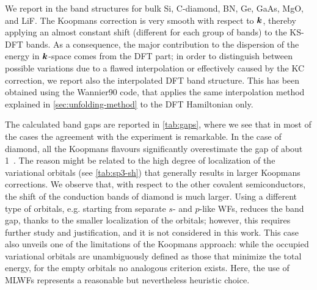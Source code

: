 We report in  the band structures for bulk Si, C-diamond, BN, Ge, GaAs, MgO, and LiF. The Koopmans correction is very smooth with respect to ${\bm k}$, thereby applying an almost constant shift (different for each group of bands) to the KS-DFT bands. As a consequence, the major contribution to the dispersion of the energy in ${\bm k}$-space comes from the DFT part; in order to distinguish between possible variations due to a flawed interpolation or effectively caused by the KC correction, we report also the interpolated DFT band structure. This has been obtained using the Wannier90 code, that applies the same interpolation method explained in \cref{sec:unfolding-method} to the DFT Hamiltonian only.

The calculated band gaps are reported in \cref{tab:gaps}, where we see that in most of the cases the agreement with the experiment is remarkable. In the case of diamond, all the Koopmans flavours significantly overestimate the gap of about 1~\ev. The reason might be related to the high degree of localization of the variational orbitals (see \cref{tab:sp3-sh}) that generally results in larger Koopmans corrections. We observe that, with respect to the other covalent semiconductors, the shift of the conduction bands of diamond is much larger. Using a different type of orbitals, e.g. starting from separate $s$- and $p$-like WFs, reduces the band gap, thanks to the smaller localization of the orbitals; however, this requires further study and justification, and it is not considered in this work. This case also unveils one of the limitations of the Koopmans approach: while the occupied variational orbitals are unambiguously defined as those that minimize the total energy, for the empty orbitals no analogous criterion exists. Here, the use of MLWFs represents a reasonable but nevertheless heuristic choice.

